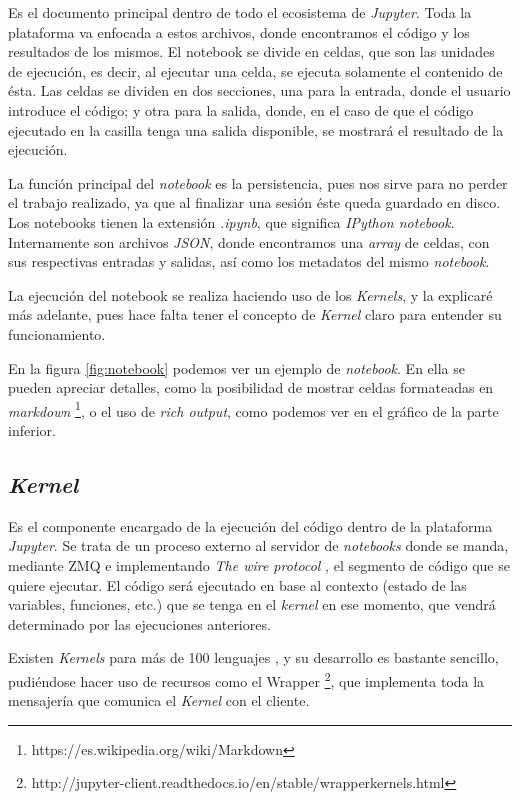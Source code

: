 \documentclass[11pt,spanish,listoffigures,listoftables]{tfgetsinf}
\begin{document}
Es el documento principal dentro de todo el ecosistema de \textit{Jupyter}. Toda la plataforma va enfocada a estos archivos, donde encontramos el código y los resultados de los mismos. El notebook se divide en celdas, que son las unidades de ejecución, es decir, al ejecutar una celda, se ejecuta solamente el contenido de ésta. Las celdas se dividen en dos secciones, una para la entrada, donde el usuario introduce el código; y otra para la salida, donde, en el caso de que el código ejecutado en la casilla tenga una salida disponible, se mostrará el resultado de la ejecución. 

La función principal del \textit{notebook} es la persistencia, pues nos sirve para no perder el trabajo realizado, ya que al finalizar una sesión éste queda guardado en disco. Los notebooks tienen la extensión \textit{.ipynb}, que significa \textit{IPython notebook}. Internamente son archivos \textit{JSON}, donde encontramos una \textit{array} de celdas, con sus respectivas entradas y salidas, así como los metadatos del mismo \textit{notebook}.

La ejecución del notebook se realiza haciendo uso de los \textit{Kernels}, y la explicaré más adelante, pues hace falta tener el concepto de \textit{Kernel} claro para entender su funcionamiento.

En la figura \ref{fig:notebook} podemos ver un ejemplo de \textit{notebook}. En ella se pueden apreciar detalles, como la posibilidad de mostrar celdas formateadas en \textit{markdown} \footnote{https://es.wikipedia.org/wiki/Markdown}, o el uso de \textit{rich output}, como podemos ver en el gráfico de la parte inferior.


\subsection{\textit{Kernel}}
\label{subsec:estructura-kernel}

Es el componente encargado de la ejecución del código dentro de la plataforma \textit{Jupyter}. Se trata de un proceso externo al servidor de \textit{notebooks} donde se manda, mediante ZMQ e implementando \textit{The wire protocol} \cite{wire-protocol}, el segmento de código que se quiere ejecutar. El código será ejecutado en base al contexto (estado de las variables, funciones, etc.) que se tenga en el \textit{kernel} en ese momento, que vendrá determinado por las ejecuciones anteriores.

Existen \textit{Kernels} para más de 100 lenguajes \cite{kernel-list}, y su desarrollo es bastante sencillo, pudiéndose hacer uso de recursos como el Wrapper \footnote{http://jupyter-client.readthedocs.io/en/stable/wrapperkernels.html}, que implementa toda la mensajería que comunica el \textit{Kernel} con el cliente.
\end{document}
